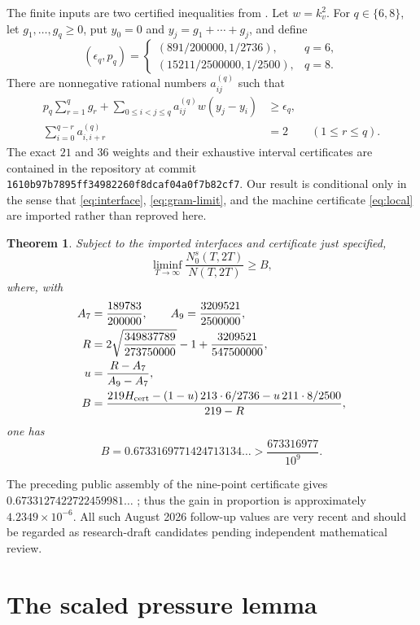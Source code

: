 \documentclass[11pt]{amsart}
\newtheorem{theorem}{Theorem}[section]
\theoremstyle{remark}
\begin{document}
The finite inputs are two certified inequalities from \cite{Trmdy2026}.
Let $w=k_v^2$.  For $q\in\{6,8\}$, let $g_1,\ldots,g_q\ge0$, put $y_0=0$
and $y_j=g_1+\cdots+g_j$, and define
\[
 (\epsilon_q,p_q)=
 \begin{cases}
  (891/200000,1/2736),&q=6,\\
  (15211/2500000,1/2500),&q=8.
 \end{cases}
\]
There are nonnegative rational numbers $a_{ij}^{(q)}$ such that
\begin{align}
 p_q\sum_{r=1}^qg_r
 +\sum_{0\le i<j\le q}a_{ij}^{(q)}w(y_j-y_i)
 &\ge \epsilon_q,
 \label{eq:local}\\
 \sum_{i=0}^{q-r}a_{i,i+r}^{(q)}&=2
 \qquad(1\le r\le q).
 \label{eq:capacity}
\end{align}
The exact $21$ and $36$ weights and their exhaustive interval certificates
are contained in the repository at commit
\texttt{1610b97b7895ff34982260f8dcaf04a0f7b82cf7}.  Our result is conditional
only in the sense that \eqref{eq:interface}, \eqref{eq:gram-limit}, and the
machine certificate \eqref{eq:local} are imported rather than reproved here.

\begin{theorem}\label{thm:main}
Subject to the imported interfaces and certificate just specified,
\[
 \liminf_{T\to\infty}\frac{N_0^s(T,2T)}{N(T,2T)}
 \ge B,
\]
where, with
\begin{align*}
 A_7&=\frac{189783}{200000},
 \qquad A_9=\frac{3209521}{2500000},\\
 R&=2\sqrt{\frac{349837789}{273750000}}-1
       +\frac{3209521}{547500000},\\
 u&=\frac{R-A_7}{A_9-A_7},\\
 B&=
 \frac{219H_{\rm cert}
 -(1-u)\,213\cdot6/2736-u\,211\cdot8/2500}{219-R},
\end{align*}
one has
\[
 B=0.6733169771424713134\ldots
 >\frac{673316977}{10^9}.
\]
\end{theorem}

The preceding public assembly of the nine-point certificate gives
$0.6733127422722459981\ldots$ \cite{Trmdy2026}; thus the gain in proportion
is approximately $4.2349\times10^{-6}$.  All such August 2026 follow-up
values are very recent and should be regarded as research-draft candidates
pending independent mathematical review.

\section{The scaled pressure lemma}
\end{document}
